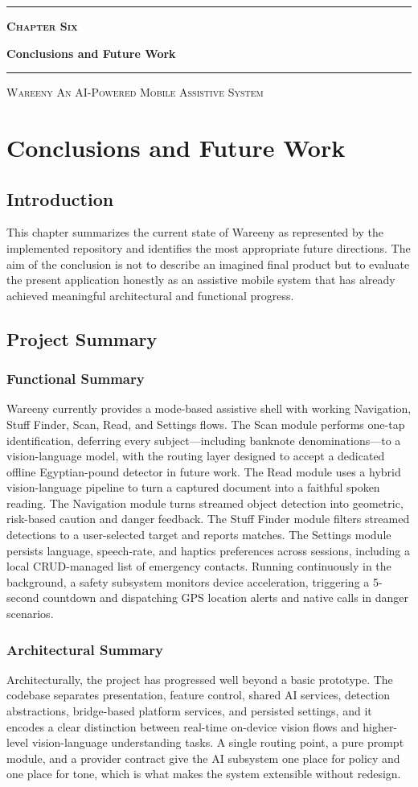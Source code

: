 \documentclass[a4paper]{report}
\newcommand{\chaptercover}[3]{%
  \clearpage
  \thispagestyle{empty}
  \begin{center}
  \vspace*{\fill}
    \makebox[0pt]{\raisebox{-0.30\height}{\textcolor{coverghost}{\fontsize{190}{190}\selectfont\bfseries #1}}}\par
    \vspace{1.9cm}
    {\color{coveraccent}\rule{0.16\textwidth}{3pt}}\par
    \vspace{0.5cm}
    {\Large\bfseries\scshape\color{coveraccent} #2\par}
    \vspace{0.6cm}
    {\fontsize{32}{37}\selectfont\bfseries\color{coverink} #3\par}
    \vspace{0.8cm}
    {\color{coverink!35}\rule{0.55\textwidth}{0.6pt}}\par
  \vspace*{\fill}
    {\footnotesize\scshape\color{coverink!55} Wareeny \quad\textbullet\quad An AI-Powered Mobile Assistive System\par}
    \vspace{0.8cm}
  \end{center}
  \clearpage
}
\begin{document}
\chaptercover{6}{Chapter Six}{Conclusions and Future Work}
\chapter{Conclusions and Future Work}

\section{Introduction}
This chapter summarizes the current state of Wareeny as represented by the implemented repository and identifies the most appropriate future directions. The aim of the conclusion is not to describe an imagined final product but to evaluate the present application honestly as an assistive mobile system that has already achieved meaningful architectural and functional progress.

\section{Project Summary}
\subsection{Functional Summary}
Wareeny currently provides a mode-based assistive shell with working Navigation, Stuff Finder, Scan, Read, and Settings flows. The Scan module performs one-tap identification, deferring every subject---including banknote denominations---to a vision-language model, with the routing layer designed to accept a dedicated offline Egyptian-pound detector in future work. The Read module uses a hybrid vision-language pipeline to turn a captured document into a faithful spoken reading. The Navigation module turns streamed object detection into geometric, risk-based caution and danger feedback. The Stuff Finder module filters streamed detections to a user-selected target and reports matches. The Settings module persists language, speech-rate, and haptics preferences across sessions, including a local CRUD-managed list of emergency contacts. Running continuously in the background, a safety subsystem monitors device acceleration, triggering a 5-second countdown and dispatching GPS location alerts and native calls in danger scenarios.

\subsection{Architectural Summary}
Architecturally, the project has progressed well beyond a basic prototype. The codebase separates presentation, feature control, shared AI services, detection abstractions, bridge-based platform services, and persisted settings, and it encodes a clear distinction between real-time on-device vision flows and higher-level vision-language understanding tasks. A single routing point, a pure prompt module, and a provider contract give the AI subsystem one place for policy and one place for tone, which is what makes the system extensible without redesign.
\end{document}
